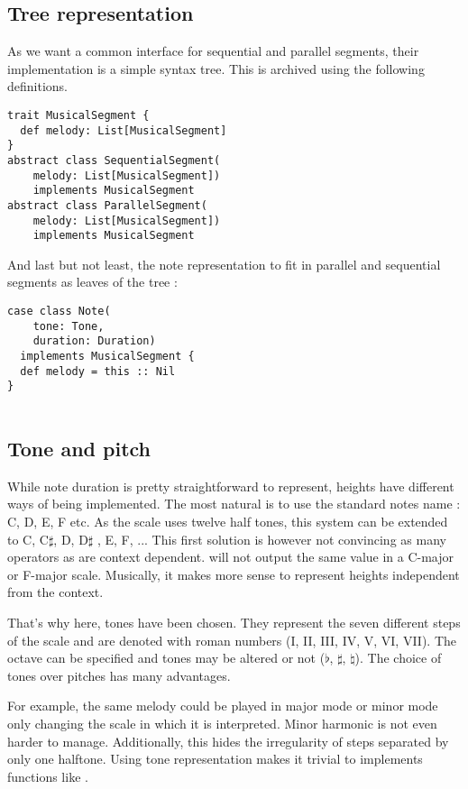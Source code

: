 \documentclass[twocolumn, 11pt]{article}
\begin{document}
\subsection{Tree representation}
As we want a common interface for sequential and parallel segments, their implementation is a simple syntax tree.
This is archived using the following definitions.
\begin{lstlisting}
trait MusicalSegment {
  def melody: List[MusicalSegment]
}
abstract class SequentialSegment(
    melody: List[MusicalSegment])
    implements MusicalSegment
abstract class ParallelSegment(
    melody: List[MusicalSegment])
    implements MusicalSegment
\end{lstlisting}
And last but not least, the note representation to fit in parallel and sequential segments as leaves of the tree :

\begin{lstlisting}
case class Note(
    tone: Tone,
    duration: Duration)
  implements MusicalSegment {
  def melody = this :: Nil
}


\end{lstlisting}

\subsection{Tone and pitch}

While note duration is pretty straightforward to represent, heights have different ways of being implemented.
The most natural is to use the standard notes name : C, D, E, F etc. As the scale uses twelve half tones, this system can be extended to C, C$\sharp$, D, D$\sharp$ , E, F, ... This first solution is however not convincing as many operators as  are context dependent.  will not output the same value in a C-major or F-major scale. Musically, it makes more sense to represent heights independent from the context.

That's why here, tones have been chosen. They represent the seven different steps of the scale and are denoted with roman numbers (I, II, III, IV, V, VI, VII). The octave can be specified and tones may be altered or not ($\flat$, $\sharp$, $\natural$).
The choice of tones over pitches has many advantages.

For example, the same melody could be played in major mode or minor mode only changing the scale in which it is interpreted. Minor harmonic is not even harder to manage. Additionally, this hides the irregularity of steps separated by only one halftone. Using tone representation makes it trivial to implements functions like .
\end{document}
